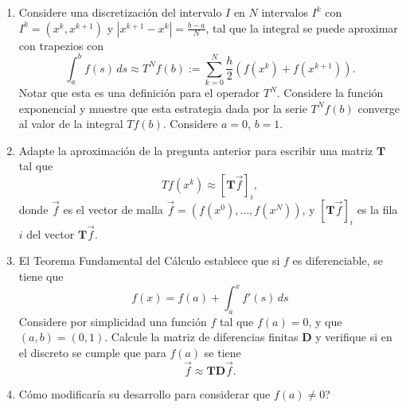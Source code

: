 \documentclass{article}
\newcommand{\pts}[1]{[{\bf #1 puntos}] }
\begin{document}
\begin{enumerate}
        \begin{enumerate}
            \item\pts{1} Considere una discretización del intervalo $I$ en $N$ intervalos $I^k$ con $I^k = (x^k, x^{k+1})$ y $|x^{k+1} - x^k| = \frac{b-a}{N}$, tal que la integral se puede aproximar con trapezios con
                $$ \int_a^b f(s)\,ds \approx T^Nf(b) := \sum_{k=0}^N \frac h 2 \left( f(x^k) + f(x^{k+1})  \right). $$
                Notar que esta es una definición para el operador $T^N$.  Considere la función exponencial y muestre que esta estrategia dada por la serie $T^Nf(b)$ converge al valor de la integral $Tf(b)$. Considere $a=0$, $b=1$.
            \item\pts{1} Adapte la aproximación de la pregunta anterior para escribir una matriz $\mathbf{T}$ tal que 
                $$ Tf(x^k) \approx [\mathbf{T} \vec f]_i, $$
                donde $\vec f$ es el vector de malla $\vec f = (f(x^0), \dots, f(x^N))$, y $[\mathbf T \vec f]_i$ es la fila $i$ del vector $\mathbf T \vec f$. 
            \item\pts{1} El Teorema Fundamental del Cálculo establece que si $f$ es diferenciable, se tiene que 
                    $$ f(x) = f(a) + \int_a^x f'(s)\,ds $$
                    Considere por simplicidad una función $f$ tal que $f(a) = 0$, y que $(a,b)=(0,1)$. Calcule la matriz de diferencias finitas $\mathbf{D}$ y verifique si en el discreto se cumple que para $f(a)$ se tiene
                    $$ \vec f \approx \mathbf{T} \mathbf{D} \vec f. $$
            \item\pts{1} Cómo modificaría su desarrollo para considerar que $f(a)\neq 0$? 
        \end{enumerate}


\end{enumerate}
\end{document}

